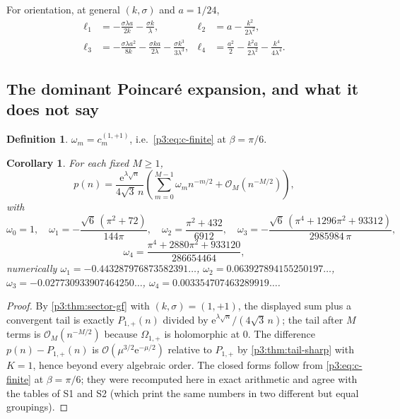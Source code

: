 \documentclass[11pt,a4paper,oneside]{book}
\theoremstyle{plain}
\newtheorem{corollary}[theorem]{Corollary}
\theoremstyle{definition}
\newtheorem{definition}[theorem]{Definition}
\theoremstyle{remark}
\newcommand{\e}{\mathrm{e}}
\newcommand{\bigO}{\mathcal{O}}
\begin{document}
For orientation, at general $(k,\sigma)$ and $a=1/24$,
\begin{align}
 \ell_{1}&=-\frac{\sigma\lambda a}{2k}-\frac{\sigma k}{\lambda}, &
 \ell_{2}&=a-\frac{k^{2}}{2\lambda^{2}},\nonumber\\
 \ell_{3}&=-\frac{\sigma\lambda a^{2}}{8k}-\frac{\sigma k a}{2\lambda}
 -\frac{\sigma k^{3}}{3\lambda^{3}}, &
 \ell_{4}&=\frac{a^{2}}{2}-\frac{k^{2}a}{2\lambda^{2}}
 -\frac{k^{4}}{4\lambda^{4}} .\label{p3:eq:ell-first}
\end{align}

\subsection{The dominant Poincar\'e expansion, and what it does not say}

\begin{definition}\label{p3:def:omega}
$\omega_{m}=c^{(1,+1)}_{m}$, i.e.\ \cref{p3:eq:c-finite} at $\beta=\pi/6$.
\end{definition}

\begin{corollary}\label{p3:cor:poincare}
For each fixed $M\ge1$,
\begin{equation}\label{p3:eq:poincare}
 p(n)=\frac{\e^{\lambda\sqrt n}}{4\sqrt3\,n}
 \left(\sum_{m=0}^{M-1}\omega_{m}n^{-m/2}+\bigO_{M}(n^{-M/2})\right),
\end{equation}
with
\begin{equation}\label{p3:eq:omega-first}
 \omega_{0}=1,\quad
 \omega_{1}=-\frac{\sqrt6\,(\pi^{2}+72)}{144\pi},\quad
 \omega_{2}=\frac{\pi^{2}+432}{6912},\quad
 \omega_{3}=-\frac{\sqrt6\,(\pi^{4}+1296\pi^{2}+93312)}{2985984\,\pi},
\end{equation}
\begin{equation}\label{p3:eq:omega-four}
 \omega_{4}=\frac{\pi^{4}+2880\pi^{2}+933120}{286654464},
\end{equation}
numerically $\omega_{1}=-0.443287976873582391\ldots$, $\omega_{2}=0.063927894155250197\ldots$,
$\omega_{3}=-0.027730933907464250\ldots$, $\omega_{4}=0.003354707463289919\ldots$.
\end{corollary}

\begin{proof}
By \cref{p3:thm:sector-gf} with $(k,\sigma)=(1,+1)$, the displayed sum plus a convergent tail is
exactly $P_{1,+}(n)$ divided by $\e^{\lambda\sqrt n}/(4\sqrt3\,n)$; the tail after $M$ terms is
$\bigO_{M}(n^{-M/2})$ because $\Omega_{1,+}$ is holomorphic at $0$. The difference
$p(n)-P_{1,+}(n)$ is $\bigO(\mu^{3/2}\e^{-\mu/2})$ relative to $P_{1,+}$ by
\cref{p3:thm:tail-sharp} with $K=1$, hence beyond every algebraic order. The closed forms follow
from \cref{p3:eq:c-finite} at $\beta=\pi/6$; they were recomputed here in exact arithmetic and
agree with the tables of S1 and S2 (which print the same numbers in two different but equal
groupings).
\end{proof}
\end{document}
